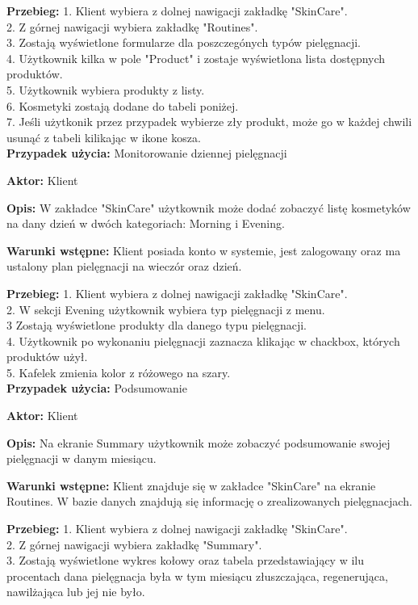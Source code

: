\textbf{Przebieg:} 
1. Klient wybiera z dolnej nawigacji zakładkę "SkinCare".\\
2. Z górnej nawigacji wybiera zakładkę "Routines".\\
3. Zostają wyświetlone formularze dla poszczegónych typów pielęgnacji. \\
4. Użytkownik kilka w pole "Product" i zostaje wyświetlona lista dostępnych produktów.\\
5. Użytkownik wybiera produkty z listy.\\
6. Kosmetyki zostają dodane do tabeli poniżej. \\
7. Jeśli użytkonik przez przypadek wybierze zły produkt, może go w każdej chwili usunąć z tabeli kilikając w ikone kosza.\\


\textbf{Przypadek użycia:} Monitorowanie dziennej pielęgnacji

\textbf{Aktor:} Klient

\textbf{Opis:} W zakładce "SkinCare" użytkownik może dodać zobaczyć listę kosmetyków na dany dzień w dwóch kategoriach: Morning i Evening.

\textbf{Warunki wstępne:} Klient posiada konto w systemie, jest zalogowany oraz ma ustalony plan pielęgnacji na wieczór oraz dzień.

\textbf{Przebieg:} 
1. Klient wybiera z dolnej nawigacji zakładkę "SkinCare".\\
2. W sekcji Evening użytkownik wybiera typ pielęgnacji z menu.\\
3 Zostają wyświetlone produkty dla danego typu pielęgnacji.\\
4. Użytkownik po wykonaniu pielęgnacji zaznacza klikając w chackbox, których produktów użył.\\
5. Kafelek zmienia kolor z różowego na szary.\\


\textbf{Przypadek użycia:} Podsumowanie 

\textbf{Aktor:} Klient

\textbf{Opis:} Na ekranie Summary użytkownik może zobaczyć podsumowanie swojej pielęgnacji w danym miesiącu.

\textbf{Warunki wstępne:} Klient znajduje się w zakładce "SkinCare" na ekranie Routines. W bazie danych znajdują się informację o zrealizowanych pielęgnacjach.

\textbf{Przebieg:} 
1. Klient wybiera z dolnej nawigacji zakładkę "SkinCare".\\
2. Z górnej nawigacji wybiera zakładkę "Summary".\\
3. Zostają wyświetlone wykres kołowy oraz tabela przedstawiający w ilu procentach dana pielęgnacja była w tym miesiącu złuszczająca, regenerująca, nawilżająca lub jej nie było. \\
